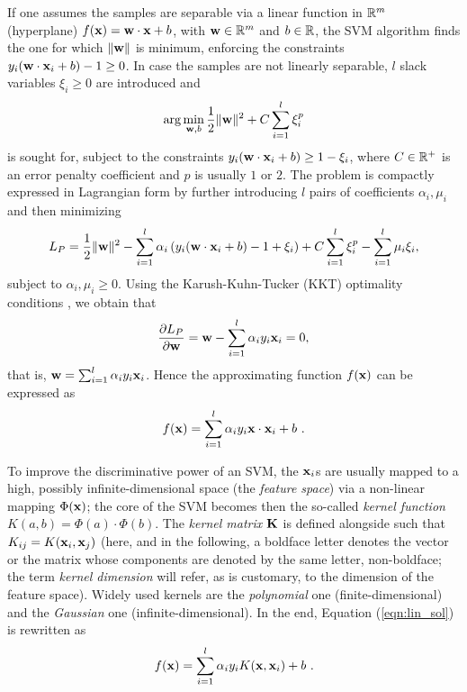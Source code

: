 If one assumes the samples are separable via a linear function in $\mathbb{R}^m$
(hyperplane) $f(\mathbf{x}) = \mathbf{w}\cdot\mathbf{x} + b$, with $\mathbf{w} \in \mathbb{R}^m$ and $b \in \mathbb{R}$,
the SVM algorithm finds the one for which $\|\mathbf{w}\|$ is minimum,
enforcing the constraints $y_i(\mathbf{w}\cdot\mathbf{x}_i + b)-1\geq 0$.
In case the samples are not linearly separable, $l$ slack variables $\xi_i \geq 0$
are introduced and
%
\begin{equation}
  \label{eqn:svm_primal}
  \arg \min_{\mathbf{w},b} \frac{1}{2} \|\mathbf{w}\|^2 + C \sum_{i=1}^l \xi_i^p
\end{equation}
%
\noindent is sought for, subject to the constraints $y_i (\mathbf{w}\cdot\mathbf{x}_i + b) \geq 1-\xi_i$,
where $C \in \mathbb{R}^+$ is an error penalty coefficient and $p$ is usually $1$ or $2$.
The problem is compactly expressed in Lagrangian form by
further introducing $l$ pairs of coefficients $\alpha_i, \mu_i$ and then
minimizing
%
\begin{equation}
  \label{eqn:lp1}
  L_P = \frac{1}{2} \|\mathbf{w}\|^2 - \sum_{i=1}^l \alpha_i \left(y_i
        (\mathbf{w}\cdot\mathbf{x}_i+b) - 1 + \xi_i \right) + C \sum_{i=1}^l \xi_i^p
        - \sum_{i=1}^l \mu_i \xi_i,
\end{equation}
%
\noindent subject to $\alpha_i,\mu_i\geq 0$. Using the Karush-Kuhn-Tucker
(KKT) optimality conditions \cite{Cristianini00}, we obtain that
%
\begin{equation}
  \label{eqn:kkt1}
  \frac{\partial L_P}{\partial \mathbf{w}}= \mathbf{w} - \sum_{i=1}^l \alpha_i y_i \mathbf{x}_i = 0,
\end{equation}
%
\noindent that is, $\mathbf{w} = \sum_{i=1}^l \alpha_i y_i \mathbf{x}_i$. Hence the approximating
function $f(\mathbf{x})$ can be expressed as
%
\begin{equation}
  \label{eqn:lin_sol}
  f(\mathbf{x}) = \sum_{i=1}^l \alpha_i y_i \mathbf{x} \cdot \mathbf{x}_i + b~.
\end{equation}

To improve the discriminative power of an SVM, the $\mathbf{x}_i$s are usually
mapped to a high, possibly infinite-dimensional space (the \emph{feature
space}) via a non-linear mapping $\Phi(\mathbf{x})$; the core of the SVM becomes
then the so-called \emph{kernel function} $K(a,b) = \Phi(a) \cdot \Phi(b)$. The
\emph{kernel matrix} $\mathbf{K}$ is defined alongside such that $K_{ij} = K(\mathbf{x}_i,\mathbf{x}_j)$
(here, and in the following, a boldface letter denotes the vector or the matrix
whose components are denoted by the same letter, non-boldface;
the term \emph{kernel dimension} will refer, as is
customary, to the dimension of the feature space).
Widely used kernels are the \emph{polynomial} one (finite-dimensional) and the \emph{Gaussian} one
(infinite-dimensional). In the end, Equation (\ref{eqn:lin_sol}) is rewritten as
%
\begin{equation}
  \label{eqn:sol}
  f(\mathbf{x}) = \sum_{i=1}^l \alpha_i y_i K(\mathbf{x},\mathbf{x}_i) + b~.
\end{equation}

